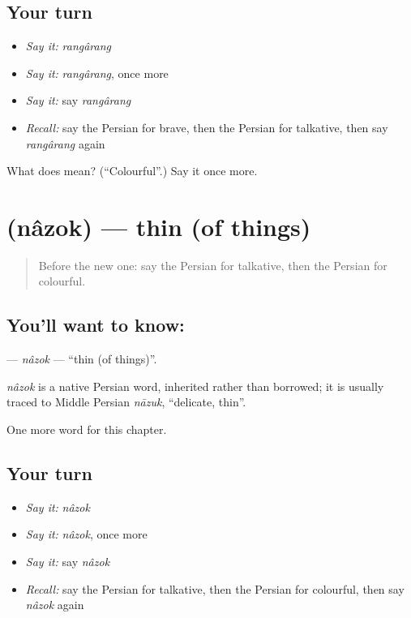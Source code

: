 \subsection*{Your turn}
\begin{itemize}
\raggedright
  \item \emph{Say it:} \emph{rangârang}
  \item \emph{Say it:} \emph{rangârang}, once more
  \item \emph{Say it:} say \emph{rangârang}
  \item \emph{Recall:} say the Persian for brave, then the Persian for talkative, then say \emph{rangârang} again
\end{itemize}

\begin{tcolorbox}[breakable,colback=teal!4,colframe=teal!35!black,title={Before you move on}]
What does  mean? (\textquotedblleft{}Colourful\textquotedblright{}.) Say it once more.
\end{tcolorbox}
\section[\texorpdfstring{\fa{نازک} (nâzok)}{نازک (nâzok)}]{ (nâzok) — thin (of things)}

\label{lesson:FA-C163-nazok}



\begin{quote}
Before the new one: say the Persian for talkative, then the Persian for colourful.
\end{quote}

\subsection*{You'll want to know: }
\textbf{} — \emph{nâzok} — \textquotedblleft{}thin (of things)\textquotedblright{}.

\begin{cousinweb}
\emph{nâzok} is a native Persian word, inherited rather than borrowed; it is usually traced to Middle Persian \emph{nāzuk}, \textquotedblleft{}delicate, thin\textquotedblright{}.
\end{cousinweb}

\begin{grammarlens}[title={What you've built}]
One more word for this chapter.
\end{grammarlens}

\subsection*{Your turn}
\begin{itemize}
\raggedright
  \item \emph{Say it:} \emph{nâzok}
  \item \emph{Say it:} \emph{nâzok}, once more
  \item \emph{Say it:} say \emph{nâzok}
  \item \emph{Recall:} say the Persian for talkative, then the Persian for colourful, then say \emph{nâzok} again
\end{itemize}

